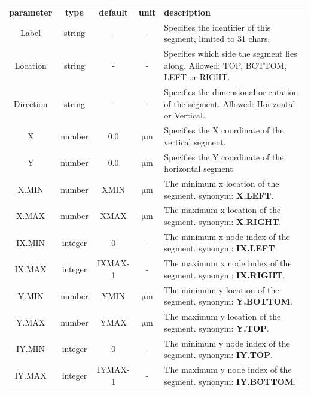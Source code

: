 \documentclass[11pt,pdftex]{article}
\begin{document}
\small
\noindent\begin{longtable}{ccccp{7cm}}
\textbf{parameter}   & \textbf{type}  & \textbf{default} & \textbf{unit} & \textbf{description} \\
Label       & string  & -       & -                    & Specifies the identifier of this segment, limited to 31 chars. \\
Location    & string  & -       & -                    & Specifies which side the segment lies along. Allowed: TOP, BOTTOM, LEFT or RIGHT.\\
Direction   & string  & -       & -                    & Specifies the dimensional orientation of the segment. Allowed: Horizontal or Vertical. \\
X           & number  & 0.0     & $\mathrm{\mu m}$     & Specifies the X coordinate of the vertical segment. \\
Y           & number  & 0.0     & $\mathrm{\mu m}$     & Specifies the Y coordinate of the horizontal segment. \\
X.MIN       & number  & XMIN    & $\mathrm{\mu m}$     & The minimum x location of the segment.
                                                         synonym: \textbf{X.LEFT}. \\
X.MAX       & number  & XMAX    & $\mathrm{\mu m}$     & The maximum x location of the segment.
                                                         synonym: \textbf{X.RIGHT}. \\
IX.MIN      & integer & 0       & -                    & The minimum x node index of the segment.
                                                         synonym: \textbf{IX.LEFT}.\\
IX.MAX      & integer & IXMAX-1 &-                     & The maximum x node index of the segment.
                                                         synonym: \textbf{IX.RIGHT}. \\
Y.MIN       & number  & YMIN    & $\mathrm{\mu m}$     & The minimum y location of the segment.
                                                         synonym: \textbf{Y.BOTTOM}. \\
Y.MAX       & number  & YMAX    & $\mathrm{\mu m}$     & The maximum y location of the segment.
                                                         synonym: \textbf{Y.TOP}. \\
IY.MIN      & integer & 0       & -                    & The minimum y node index of the segment.
                                                         synonym: \textbf{IY.TOP}. \\
IY.MAX      & integer & IYMAX-1 & -                    & The maximum y node index of the segment.
                                                         synonym: \textbf{IY.BOTTOM}.
\end{longtable}
\normalsize
\end{document}
